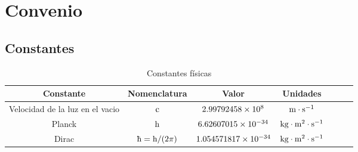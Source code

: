 \chapter[Convenio]{Convenio}
\section{Constantes}\label{sec:constantes}
\begin{table}[htbp]
    \caption{Constantes físicas\label{tab:constantes_fisicas}}
    \centering
    \begin{tabular}{ccccccc}
        \toprule
        Constante & Nomenclatura & Valor & Unidades\\
        \midrule
        Velocidad de la luz en el vacio & $\mathrm{c}$ & $2.99792458\times10^{8}$ & $\mathrm{m}\cdot\mathrm{s}^{-1}$\\
        Planck & $\mathrm{h}$ & $6.62607015\times10^{-34}$ & $\mathrm{kg}\cdot\mathrm{m}^2\cdot\mathrm{s}^{-1}$\\
        Dirac & $\planckbarsymbol=\plancksymbol/(2\pi)$ & $1.054571817\times10^{-34}$ & $\mathrm{kg}\cdot\mathrm{m}^2\cdot\mathrm{s}^{-1}$\\
        \bottomrule
    \end{tabular}
\end{table}
